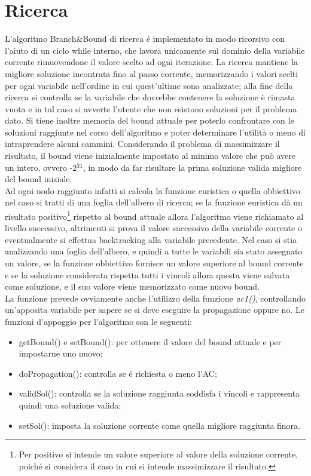 \documentclass[a4paper,12pt,italian]{article}
\begin{document}
\section{Ricerca}

L'algoritmo Branch\&Bound di ricerca \'e implementato in modo ricorsivo
con l'aiuto di un ciclo while interno, che lavora unicamente sul
dominio della variabile corrente rimuovendone il valore scelto ad ogni iterazione.
La ricerca mantiene la migliore soluzione incontrata fino al passo corrente,
memorizzando i valori scelti per ogni variabile nell'ordine in cui quest'ultime sono analizzate;
alla fine della ricerca si controlla se la variabile che dovrebbe contenere la soluzione
\`e rimasta vuota e in tal caso si avverte l'utente che non esistono soluzioni per il problema dato.
Si tiene inoltre memoria del bound attuale per poterlo confrontare con le
soluzioni raggiunte nel corso dell'algoritmo e poter determinare l'utilit\`a o meno
di intraprendere alcuni cammini. Considerando il problema di massimizzare il risultato,
il bound viene inizialmente impostato al minimo valore che pu\`o avere un intero, ovvero -2$^{31}$, in modo
da far risultare la prima soluzione valida migliore del bound iniziale.\\
Ad ogni nodo raggiunto infatti si calcola la funzione euristica o quella obbiettivo nel caso si tratti
di una foglia dell'albero di ricerca; se la funzione euristica d\`a un
risultato positivo\footnote{Per positivo si intende un valore
  superiore al valore della soluzione corrente, poich\'e
si considera il caso in cui si intende massimizzare il risultato.} 
rispetto al bound attuale allora l'algoritmo viene
richiamato al livello successivo, altrimenti si prova il valore successivo
della variabile corrente o eventualmente si effettua backtracking alla
variabile precedente. Nel caso si stia analizzando una foglia dell'albero, e quindi a tutte
le variabili sia stato assegnato un valore, se la funzione obbiettivo fornisce
un valore superiore al bound corrente e se la soluzione considerata rispetta
tutti i vincoli allora questa viene salvata come soluzione, e il suo valore viene
memorizzato come nuovo bound.\\
La funzione prevede ovviamente anche l'utilizzo della funzione \textit{ac1()}, controllando
un'apposita variabile per sapere se si deve eseguire la propagazione oppure no.
Le funzioni d'appoggio per l'algoritmo son le seguenti:

\begin{itemize}
 \item getBound() e setBound(): per ottenere il valore del bound attuale e per impostarne uno nuovo;
 \item doPropagation(): controlla se \'e richiesta o meno l'AC;
 \item validSol(): controlla se la soluzione raggiunta soddisfa i vincoli e rappresenta quindi
una soluzione valida; 
 \item setSol(): imposta la soluzione corrente come quella migliore raggiunta finora.
\end{itemize}
\end{document}
